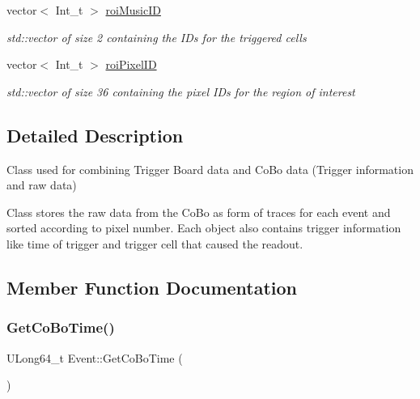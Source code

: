 \begin{DoxyCompactItemize}
\mbox{\label{classEvent_ab57fdbb443ae1280ebb8f13592be2dcd}} 
vector$<$ Int\+\_\+t $>$ \hyperlink{classEvent_ab57fdbb443ae1280ebb8f13592be2dcd}{roi\+Music\+ID}
\begin{DoxyCompactList}\small\item\em std\+::vector of size 2 containing the I\+Ds for the triggered cells \end{DoxyCompactList}\item 
\mbox{\label{classEvent_a277770d922cbcd9518b429b57ae0a07a}} 
vector$<$ Int\+\_\+t $>$ \hyperlink{classEvent_a277770d922cbcd9518b429b57ae0a07a}{roi\+Pixel\+ID}
\begin{DoxyCompactList}\small\item\em std\+::vector of size 36 containing the pixel I\+Ds for the region of interest \end{DoxyCompactList}\end{DoxyCompactItemize}


\subsection{Detailed Description}
Class used for combining Trigger Board data and Co\+Bo data (Trigger information and raw data) 

Class stores the raw data from the Co\+Bo as form of traces for each event and sorted according to pixel number. Each object also contains trigger information like time of trigger and trigger cell that caused the readout. 

\subsection{Member Function Documentation}
\mbox{\label{classEvent_a2e1f120d13a6ebdd348546ee057cb72b}} 
\subsubsection{\texorpdfstring{Get\+Co\+Bo\+Time()}{GetCoBoTime()}}
{\footnotesize\ttfamily U\+Long64\+\_\+t Event\+::\+Get\+Co\+Bo\+Time (\begin{DoxyParamCaption}{ }\end{DoxyParamCaption})}



